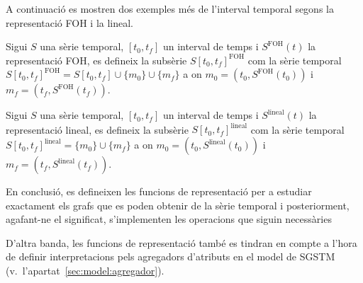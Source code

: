 A continuació es mostren dos exemples més de l'interval temporal
segons la representació FOH i la lineal.
\begin{definition}
  \label{def:sgst:interval-temporal-foh}
  Sigui $S$ una sèrie temporal, $[t_0,t_f]$ un interval de temps i
  $S^\text{FOH}(t)$ la representació FOH, es defineix la subsèrie
  $S[t_0,t_f]^{\text{FOH}}$ com la sèrie temporal
  $S[t_0,t_f]^{\text{FOH}} = S[t_0,t_f] \cup \{m_0\} \cup \{m_f\}$ a
  on $m_0=(t_0,S^{\text{FOH}}(t_0))$ i $m_f=(t_f,S^{\text{FOH}}(t_f))$.
\end{definition}

\begin{definition}
  \label{def:sgst:interval-temporal-lineal}
  Sigui $S$ una sèrie temporal, $[t_0,t_f]$ un interval de temps i
  $S^\text{lineal}(t)$ la representació lineal, es defineix la subsèrie
  $S[t_0,t_f]^{\text{lineal}}$ com la sèrie temporal
  $S[t_0,t_f]^{\text{lineal}} = \{m_0\} \cup \{m_f\}$ a
  on $m_0=(t_0,S^{\text{lineal}}(t_0))$ i $m_f=(t_f,S^{\text{lineal}}(t_f))$.
\end{definition}



En conclusió, es defineixen les funcions de representació per a
estudiar exactament els grafs que es poden obtenir de la sèrie
temporal i posteriorment, agafant-ne el significat, s'implementen les
operacions que siguin necessàries


D'altra banda, les funcions de representació també es tindran en
compte a l'hora de definir interpretacions pels agregadors d'atributs
en el model de SGSTM (v.\ l'apartat~\ref{sec:model:agregador}).


























